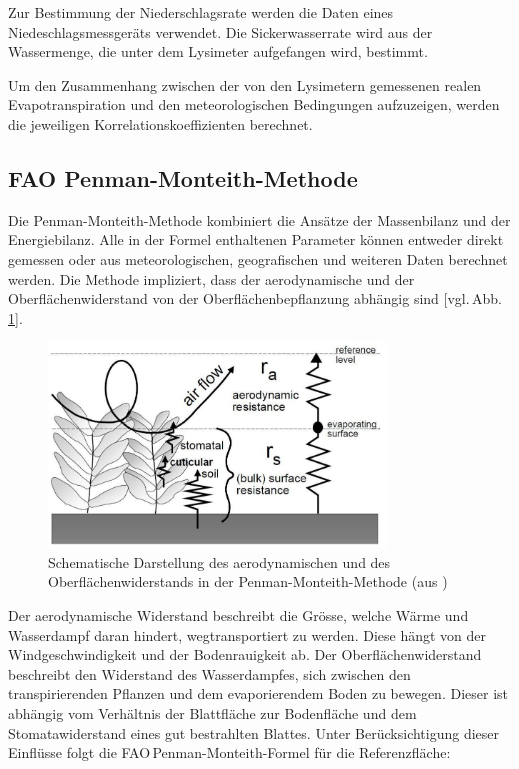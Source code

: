 Zur Bestimmung der Niederschlagsrate werden die Daten eines Niedeschlagsmessgeräts verwendet. Die Sickerwasserrate wird aus der Wassermenge, die unter dem Lysimeter aufgefangen wird, bestimmt.

Um den Zusammenhang zwischen der von den Lysimetern gemessenen realen Evapotranspiration und den meteorologischen Bedingungen aufzuzeigen, werden die jeweiligen Korrelationskoeffizienten berechnet.

\subsection{FAO Penman-Monteith-Methode}

Die Penman-Monteith-Methode kombiniert die Ansätze der Massenbilanz und der Energiebilanz. Alle in der Formel enthaltenen Parameter können entweder direkt gemessen oder aus meteorologischen, geografischen und weiteren Daten berechnet werden. Die Methode impliziert, dass der aerodynamische und der Oberflächenwiderstand von der Oberflächenbepflanzung abhängig sind [vgl.\,Abb.\,\ref{fig:widerstand}]. 

\begin{figure}[H]
\centering
\includegraphics[width=0.8\textwidth]{figures/penman_widerstand.jpg}
\caption{Schematische Darstellung des aerodynamischen und des Oberflächenwiderstands in der Penman-Monteith-Methode (aus \cite{fao})}
\label{fig:widerstand}
\end{figure}

Der aerodynamische Widerstand beschreibt die Grösse, welche Wärme und Wasserdampf daran hindert, wegtransportiert zu werden. Diese hängt von der Windgeschwindigkeit und der Bodenrauigkeit ab. Der Oberflächenwiderstand beschreibt den Widerstand des Wasserdampfes, sich zwischen den transpirierenden Pflanzen und dem evaporierendem Boden zu bewegen. Dieser ist abhängig vom Verhältnis der Blattfläche zur Bodenfläche und dem Stomatawiderstand eines gut bestrahlten Blattes. Unter Berücksichtigung dieser Einflüsse folgt die FAO\,Penman-Monteith-Formel für die Referenzfläche:

